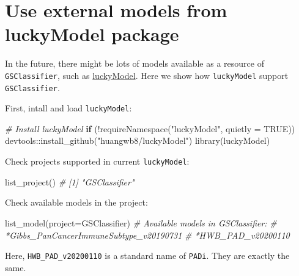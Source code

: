 \documentclass[
  12pt,
]{book}
\newenvironment{Shaded}{\begin{snugshade}}{\end{snugshade}}
\newcommand{\AttributeTok}[1]{\textcolor[rgb]{0.77,0.63,0.00}{#1}}
\newcommand{\CommentTok}[1]{\textcolor[rgb]{0.56,0.35,0.01}{\textit{#1}}}
\newcommand{\ConstantTok}[1]{\textcolor[rgb]{0.00,0.00,0.00}{#1}}
\newcommand{\ControlFlowTok}[1]{\textcolor[rgb]{0.13,0.29,0.53}{\textbf{#1}}}
\newcommand{\FunctionTok}[1]{\textcolor[rgb]{0.00,0.00,0.00}{#1}}
\newcommand{\NormalTok}[1]{#1}
\newcommand{\SpecialCharTok}[1]{\textcolor[rgb]{0.00,0.00,0.00}{#1}}
\newcommand{\StringTok}[1]{\textcolor[rgb]{0.31,0.60,0.02}{#1}}
\begin{document}
\hypertarget{use-external-models-from-luckymodel-package}{%
\section{Use external models from luckyModel package}\label{use-external-models-from-luckymodel-package}}

In the future, there might be lots of models available as a resource of \texttt{GSClassifier}, such as \href{https://github.com/huangwb8/luckyModel}{luckyModel}. Here we show how \texttt{luckyModel} support \texttt{GSClassifier}.

First, intall and load \texttt{luckyModel}:

\begin{Shaded}
\begin{Highlighting}[]
\CommentTok{\# Install luckyModel}
\ControlFlowTok{if}\NormalTok{ (}\SpecialCharTok{!}\FunctionTok{requireNamespace}\NormalTok{(}\StringTok{"luckyModel"}\NormalTok{, }\AttributeTok{quietly =} \ConstantTok{TRUE}\NormalTok{))}
\NormalTok{    devtools}\SpecialCharTok{::}\FunctionTok{install\_github}\NormalTok{(}\StringTok{"huangwb8/luckyModel"}\NormalTok{)}
\FunctionTok{library}\NormalTok{(luckyModel)}
\end{Highlighting}
\end{Shaded}

Check projects supported in current \texttt{luckyModel}:

\begin{Shaded}
\begin{Highlighting}[]
\FunctionTok{list\_project}\NormalTok{()}
\CommentTok{\# [1] "GSClassifier"}
\end{Highlighting}
\end{Shaded}

Check available models in the project:

\begin{Shaded}
\begin{Highlighting}[]
\FunctionTok{list\_model}\NormalTok{(}\AttributeTok{project=}\StringTok{\textquotesingle{}GSClassifier\textquotesingle{}}\NormalTok{)}
\CommentTok{\# Available models in GSClassifier:}
\CommentTok{\#   *Gibbs\_PanCancerImmuneSubtype\_v20190731}
\CommentTok{\#   *HWB\_PAD\_v20200110}
\end{Highlighting}
\end{Shaded}

Here, \texttt{HWB\_PAD\_v20200110} is a standard name of \texttt{PADi}. They are exactly the same.
\end{document}
